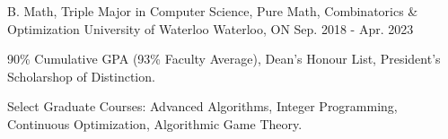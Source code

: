 

\begin{cventries}

  \cventry
    {B. Math, Triple Major in Computer Science, Pure Math, Combinatorics \& Optimization} %
    {University of Waterloo} %
    {Waterloo, ON} %
    {Sep. 2018 - Apr. 2023} %
    {
      \begin{cvitems} %
      \item {90\% Cumulative GPA (93\% Faculty Average), Dean's Honour List, President's Scholarshop of Distinction.}
      \item {Select Graduate Courses: Advanced Algorithms, Integer Programming, Continuous Optimization, Algorithmic Game Theory.}
      \end{cvitems}
    }

\end{cventries}
